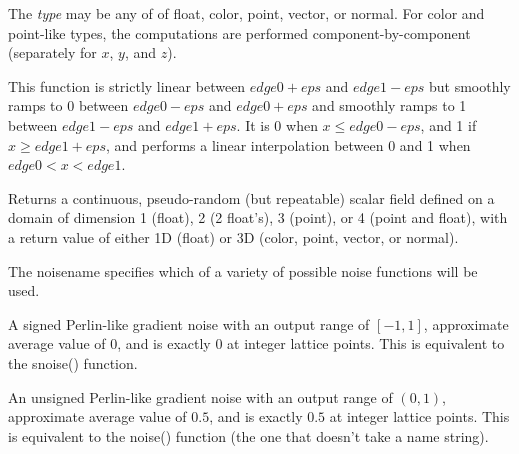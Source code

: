 \documentclass[11pt,letterpaper]{book}
\def\color{{\cf color}\xspace}
\def\float{{\cf float}\xspace}
\def\normal{{\cf normal}\xspace}
\def\point{{\cf point}\xspace}
\def\vector{{\cf vector}\xspace}
\begin{document}
The \emph{type} may be any of of \float, \color, \point, \vector, or
\normal.  For \color and \point-like types, the computations are
performed component-by-component (separately for $x$, $y$, and $z$).
\apiend

This function is strictly linear between ${\mathit edge0}+{\mathit eps}$ and ${\mathit edge1}-{\mathit eps}$
but smoothly ramps to 0 between ${\mathit edge0}-{\mathit eps}$ and ${\mathit edge0}+{\mathit eps}$
and smoothly ramps to 1 between ${\mathit edge1}-{\mathit eps}$ and ${\mathit edge1}+{\mathit eps}$.
It is 0 when $x \le {\mathit edge0}-{\mathit eps}$, and 1 if $x \ge {\mathit edge1}+{\mathit eps}$,
and performs a linear
interpolation between 0 and 1 when ${\mathit edge0} < x < {\mathit edge1}$.
\apiend


%


Returns a continuous, pseudo-random (but repeatable) scalar field
defined on a domain of dimension 1 (\float), 2 (2 \float's), 3 (\point),
or 4 (\point and \float), with a return value of either 1D (\float) or 3D
(\color, \point, \vector, or \normal).

The {\cf noisename} specifies which of a variety of possible noise
functions will be used.  

\vspace{12pt}

A signed Perlin-like gradient noise with an output range of $[-1,1]$,
approximate average value of $0$, and is exactly $0$ at integer lattice
points.  This is equivalent to the {\cf snoise()} function.

\apiend
\vspace{-16pt}

\vspace{12pt}
An unsigned Perlin-like gradient noise with an output range of $(0,1)$,
approximate average value of $0.5$, and is exactly $0.5$ at integer
lattice points.  This is equivalent to the {\cf noise()} function (the
one that doesn't take a name string).
\apiend
\vspace{-16pt}
\end{document}
